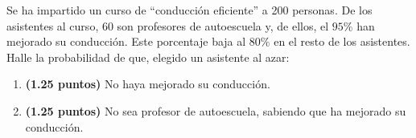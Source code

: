 
Se ha impartido un curso de ``conducción eficiente'' a 200 personas. De los asistentes al curso, 60 son profesores de autoescuela y, de ellos, el $95\%$ han mejorado su conducción. Este porcentaje baja al $80\%$ en el resto de los asistentes. Halle la probabilidad de que, elegido un asistente al azar:
\begin{enumerate}[label=\alph*)]
\item \textbf{(1.25 puntos)} No haya mejorado su conducción.
\item \textbf{(1.25 puntos)} No sea profesor de autoescuela, sabiendo que ha mejorado su conducción.
\end{enumerate}
